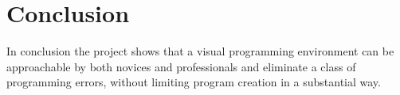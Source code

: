 \chapter{Conclusion}

In conclusion the project shows that a visual programming environment
can be approachable by both novices and professionals and eliminate a
class of programming errors, without limiting program creation
in a substantial way.